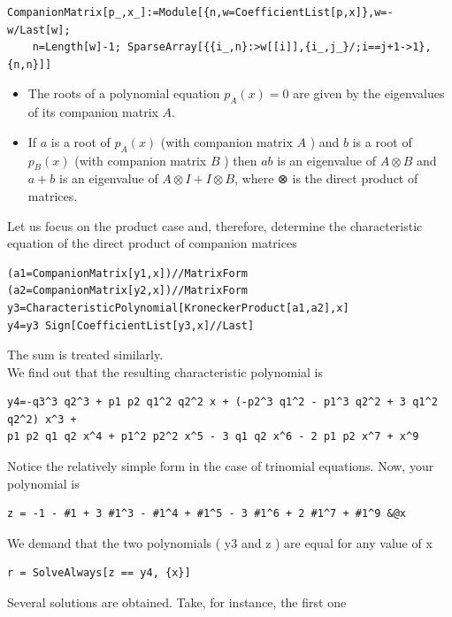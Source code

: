 \documentclass[10pt]{article}
\begin{document}
\begin{verbatim}
CompanionMatrix[p_,x_]:=Module[{n,w=CoefficientList[p,x]},w=-w/Last[w];
    n=Length[w]-1; SparseArray[{{i_,n}:>w[[i]],{i_,j_}/;i==j+1->1},{n,n}]]
\end{verbatim}

\begin{itemize}
  \item[-] The roots of a polynomial equation $p_{A}(x)=0$ are given by the eigenvalues of its companion matrix $A$.
  \item[-] If $a$ is a root of $p_{A}(x)$ (with companion matrix $A$ ) and $b$ is a root of $p_{B}(x)$ (with companion matrix $B$ ) then $a b$ is an eigenvalue of $A \otimes B$ and $a+b$ is an eigenvalue of $A \otimes I+I \otimes B$, where ⊗ is the direct product of matrices.
\end{itemize}

Let us focus on the product case and, therefore, determine the characteristic equation of the direct product of companion matrices

\begin{verbatim}
(a1=CompanionMatrix[y1,x])//MatrixForm
(a2=CompanionMatrix[y2,x])//MatrixForm
y3=CharacteristicPolynomial[KroneckerProduct[a1,a2],x]
y4=y3 Sign[CoefficientList[y3,x]//Last]
\end{verbatim}

The sum is treated similarly.\\
We find out that the resulting characteristic polynomial is

\begin{verbatim}
y4=-q3^3 q2^3 + p1 p2 q1^2 q2^2 x + (-p2^3 q1^2 - p1^3 q2^2 + 3 q1^2 q2^2) x^3 +
p1 p2 q1 q2 x^4 + p1^2 p2^2 x^5 - 3 q1 q2 x^6 - 2 p1 p2 x^7 + x^9
\end{verbatim}

Notice the relatively simple form in the case of trinomial equations. Now, your polynomial is

\begin{verbatim}
z = -1 - #1 + 3 #1^3 - #1^4 + #1^5 - 3 #1^6 + 2 #1^7 + #1^9 &@x
\end{verbatim}

We demand that the two polynomials ( y3 and z ) are equal for any value of x

\begin{verbatim}
r = SolveAlways[z == y4, {x}]
\end{verbatim}

Several solutions are obtained. Take, for instance, the first one
\end{document}
